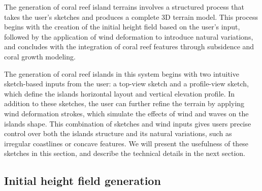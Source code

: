 \documentclass{egpubl}
\begin{document}
The generation of coral reef island terrains involves a structured process that takes the user's sketches and produces a complete 3D terrain model. This process begins with the creation of the initial height field based on the user's input, followed by the application of wind deformation to introduce natural variations, and concludes with the integration of coral reef features through subsidence and coral growth modeling.




The generation of coral reef islands in this system begins with two intuitive sketch-based inputs from the user: a top-view sketch and a profile-view sketch, which define the islands horizontal layout and vertical elevation profile. In addition to these sketches, the user can further refine the terrain by applying wind deformation strokes, which simulate the effects of wind and waves on the islands shape. This combination of sketches and wind inputs gives users precise control over both the islands structure and its natural variations, such as irregular coastlines or concave features. We will present the usefulness of these sketches in this section, and describe the technical details in the next section.



\subsection{Initial height field generation}
\label{sec:coral-island_generation-initial}



\end{document}
